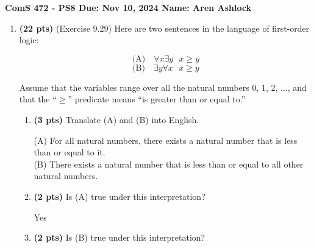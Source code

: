 \documentclass{article}
\begin{document}
\noindent\textbf{ComS 472 - PS8 \quad Due: Nov 10, 2024 \quad Name: Aren Ashlock}

\begin{enumerate}


\item \textbf{(22 pts)} (Exercise 9.29) Here are two sentences in the language of first-order logic:

\begin{equation*}
    \text{(A)} \quad \forall x \exists y \text{ } x \geq y
\end{equation*}
\begin{equation*}
    \text{(B)} \quad \exists y \forall x \text{ } x \geq y
\end{equation*}

Assume that the variables range over all the natural numbers 0, 1, 2, ..., and that the “$\geq$” predicate means “is greater than or equal to.”

    \begin{enumerate}[label=($\alph*$)]


    \item \textbf{(3 pts)} Translate (A) and (B) into English.

    \color{blue}
        (A) For all natural numbers, there exists a natural number that is less than or equal to it.\\
        (B) There exists a natural number that is less than or equal to all other natural numbers.
    \color{black}



    \item \textbf{(2 pts)} Is (A) true under this interpretation?

    \color{blue}
        Yes
    \color{black}



    \item \textbf{(2 pts)} Is (B) true under this interpretation?


\end{enumerate}
\end{enumerate}
\end{document}
